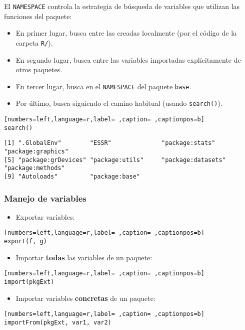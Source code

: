 El \texttt{NAMESPACE} controla la estrategia de búsqueda de variables que utilizan las funciones del paquete:
\begin{itemize}
\item En primer lugar, busca entre las creadas localmente (por el código de la carpeta \texttt{R/}).
\item En segundo lugar, busca entre las variables importadas explícitamente de otros paquetes.
\item En tercer lugar, busca en el \texttt{NAMESPACE} del paquete \texttt{base}.
\item Por último, busca siguiendo el camino habitual (usando \texttt{search()}).
\end{itemize}
\begin{lstlisting}[numbers=left,language=r,label= ,caption= ,captionpos=b]
search()
\end{lstlisting}

\begin{verbatim}
[1] ".GlobalEnv"        "ESSR"              "package:stats"     "package:graphics" 
[5] "package:grDevices" "package:utils"     "package:datasets"  "package:methods"  
[9] "Autoloads"         "package:base"
\end{verbatim}

\subsubsection{Manejo de variables}
\label{sec:orgbe54771}
\begin{itemize}
\item Exportar variables:
\end{itemize}
\begin{lstlisting}[numbers=left,language=r,label= ,caption= ,captionpos=b]
export(f, g)
\end{lstlisting}
\begin{itemize}
\item Importar \textbf{todas} las variables de un paquete:
\end{itemize}
\begin{lstlisting}[numbers=left,language=r,label= ,caption= ,captionpos=b]
import(pkgExt)
\end{lstlisting}
\begin{itemize}
\item Importar variables \textbf{concretas} de un paquete:
\end{itemize}
\begin{lstlisting}[numbers=left,language=r,label= ,caption= ,captionpos=b]
importFrom(pkgExt, var1, var2)
\end{lstlisting}
